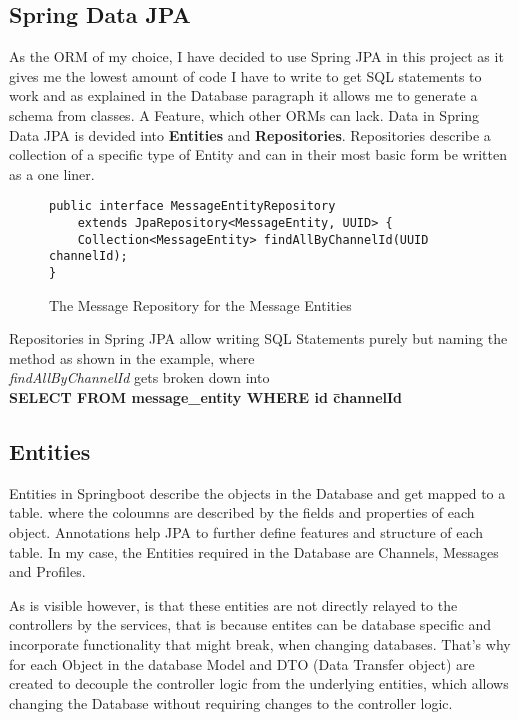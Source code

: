 \documentclass[a4paper,12pt]{article}
\begin{document}
	\subsection{Spring Data JPA}
	\label{subsec:spring_data_jpa}
	As the ORM of my choice, I have decided to use Spring JPA in this project as it gives me the lowest amount of
	code I have to write to get SQL statements to work and as explained in the Database paragraph it allows me to
	generate a schema from classes. A Feature, which other ORMs can lack.
	Data in Spring Data JPA is devided into \textbf{Entities} and \textbf{Repositories}. Repositories describe a
	collection of a specific type of Entity and can in their most basic form be written as a one liner.
	\begin{figure*}[ht!]
		\begin{lstlisting}
public interface MessageEntityRepository 
	extends JpaRepository<MessageEntity, UUID> {
	Collection<MessageEntity> findAllByChannelId(UUID channelId);
}
		\end{lstlisting}
		\caption{The Message Repository for the Message Entities}
	\end{figure*}
	Repositories in Spring JPA allow writing SQL Statements purely but naming the method as shown in the example,
	where\\ 
	\textit{findAllByChannelId} gets broken down into \\ 
	\textbf{SELECT \* FROM message\_entity WHERE id \= channelId}

	\subsection*{Entities}
	Entities in Springboot describe the objects in the Database and get mapped to a table. where the coloumns are
	described by the fields and properties of each object. Annotations help JPA to further define features and
	structure of each table. In my case, the Entities required in the Database are Channels, Messages and Profiles.

	As is visible however, is that these entities are not directly relayed to the controllers by the services, that
	is because entites can be database specific and incorporate functionality that might break, when changing
	databases. That's why for each Object in the database Model and DTO (Data Transfer object) are created
	to decouple the controller logic from the underlying entities, which allows changing the Database without
	requiring changes to the controller logic.
\end{document}
